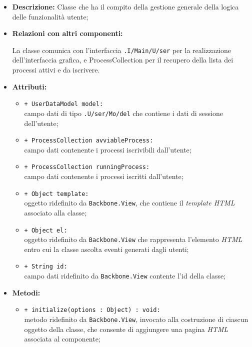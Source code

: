 \begin{flushleft}
\begin{itemize}
\item \textbf{Descrizione:} Classe che ha il compito della gestione generale della logica delle funzionalità utente;
\item \textbf{Relazioni con altri componenti:}
\begin{sloppypar}
La classe comunica con l'interfaccia \texttt{\viewUser{}.I\fshyp{}Main\fshyp{}U\fshyp{}ser} per la realizzazione dell'interfaccia grafica, e ProcessCollection per il recupero della lista dei processi attivi e da iscrivere.
\end{sloppypar}
\item \textbf{Attributi:}
\begin{sloppypar}
\begin{itemize}
\item \texttt{+ UserDataModel model:}\\ campo dati di tipo \texttt{\model{}.U\fshyp{}ser\fshyp{}Mo\fshyp{}del} che contiene i dati di sessione dell'utente;
\item \texttt{+ ProcessCollection avviableProcess:}\\ campo dati contenente i processi iscrivibili dall'utente;
\item \texttt{+ ProcessCollection runningProcess:}\\ campo dati contenente i processi iscritti dall'utente;
\item \texttt{+ Object template:}\\ oggetto ridefinito da \texttt{Backbone.View}, che contiene il \textit{template HTML} associato alla classe;
\item \texttt{+ Object el:}\\ oggetto ridefinito da \texttt{Backbone.View} che rappresenta l'elemento \textit{HTML} entro cui la classe ascolta eventi generati dagli utenti;
\item \texttt{+ String id:}\\ campo dati ridefinito da \texttt{Backbone.View} contente l'id della classe;
\end{itemize}
\end{sloppypar}
\item \textbf{Metodi:}
\begin{sloppypar}
\begin{itemize}
\item \texttt{+ initialize(options : Object) : void:}\\ metodo ridefinito da \texttt{Backbone.View}, invocato alla costruzione di ciascun oggetto della classe, che consente di aggiungere una pagina \textit{HTML} associata al componente;

\end{itemize}
\end{sloppypar}
\end{itemize}
\end{flushleft}
